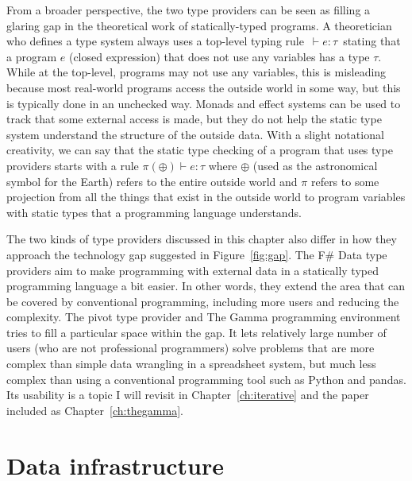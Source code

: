 \documentclass[fleqn,11pt]{report}
\theoremstyle{definition}
\begin{document}
From a broader perspective, the two type providers can be seen as filling a glaring gap in the
theoretical work of statically-typed programs. A theoretician who defines a type system always uses
a top-level typing rule \,$\vdash\!e\!:\!\tau$\, stating that a program $e$ (closed expression) that
does not use any variables has a type $\tau$. While at the top-level, programs may not use any variables,
this is misleading because most real-world programs access the outside world in some way, but
this is typically done in an unchecked way. Monads and effect systems \citep{lucassen-1988-effects,spj-1993-imperative}
can be used to track that some external access is made, but they do not help the static type
system understand the structure of the outside data.
%
With a slight notational creativity, we can say that the static type checking of a program that
uses type providers starts with a rule $\pi(\oplus) \vdash e\!:\!\tau$ where $\oplus$ (used as the
astronomical symbol for the Earth) refers to the entire outside world and $\pi$ refers
to some projection from all the things that exist in the outside world to program variables
with static types that a programming language understands.

The two kinds of type providers discussed in this chapter also differ in how they approach the
technology gap suggested in Figure~\ref{fig:gap}. The F\# Data type providers aim to make
programming with external data in a statically typed programming language a bit easier.
In other words, they extend the area that can be covered by conventional programming,
including more users and reducing the complexity. The pivot type provider and The Gamma
programming environment tries to fill a particular space within the gap. It lets relatively
large number of users (who are not professional programmers) solve problems that are more complex
than simple data wrangling in a spreadsheet system, but much less complex than using a conventional
programming tool such as Python and pandas. Its usability is a topic I will revisit in
Chapter~\ref{ch:iterative} and the paper included as Chapter~\ref{ch:thegamma}.


\chapter{Data infrastructure}
\label{ch:infra}
\end{document}
